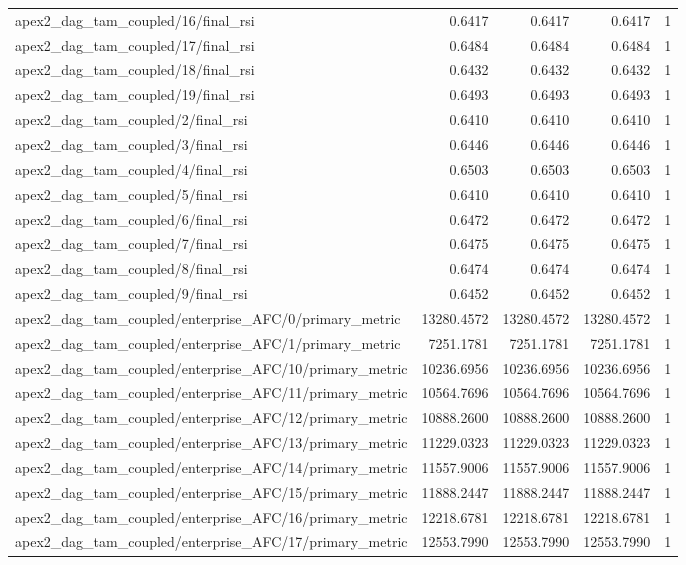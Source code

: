 \begin{table}[h]
\begin{tabular}{lrrrr}
apex2_dag_tam_coupled/16/final_rsi & 0.6417 & 0.6417 & 0.6417 & 1 \\
apex2_dag_tam_coupled/17/final_rsi & 0.6484 & 0.6484 & 0.6484 & 1 \\
apex2_dag_tam_coupled/18/final_rsi & 0.6432 & 0.6432 & 0.6432 & 1 \\
apex2_dag_tam_coupled/19/final_rsi & 0.6493 & 0.6493 & 0.6493 & 1 \\
apex2_dag_tam_coupled/2/final_rsi & 0.6410 & 0.6410 & 0.6410 & 1 \\
apex2_dag_tam_coupled/3/final_rsi & 0.6446 & 0.6446 & 0.6446 & 1 \\
apex2_dag_tam_coupled/4/final_rsi & 0.6503 & 0.6503 & 0.6503 & 1 \\
apex2_dag_tam_coupled/5/final_rsi & 0.6410 & 0.6410 & 0.6410 & 1 \\
apex2_dag_tam_coupled/6/final_rsi & 0.6472 & 0.6472 & 0.6472 & 1 \\
apex2_dag_tam_coupled/7/final_rsi & 0.6475 & 0.6475 & 0.6475 & 1 \\
apex2_dag_tam_coupled/8/final_rsi & 0.6474 & 0.6474 & 0.6474 & 1 \\
apex2_dag_tam_coupled/9/final_rsi & 0.6452 & 0.6452 & 0.6452 & 1 \\
apex2_dag_tam_coupled/enterprise_AFC/0/primary_metric & 13280.4572 & 13280.4572 & 13280.4572 & 1 \\
apex2_dag_tam_coupled/enterprise_AFC/1/primary_metric & 7251.1781 & 7251.1781 & 7251.1781 & 1 \\
apex2_dag_tam_coupled/enterprise_AFC/10/primary_metric & 10236.6956 & 10236.6956 & 10236.6956 & 1 \\
apex2_dag_tam_coupled/enterprise_AFC/11/primary_metric & 10564.7696 & 10564.7696 & 10564.7696 & 1 \\
apex2_dag_tam_coupled/enterprise_AFC/12/primary_metric & 10888.2600 & 10888.2600 & 10888.2600 & 1 \\
apex2_dag_tam_coupled/enterprise_AFC/13/primary_metric & 11229.0323 & 11229.0323 & 11229.0323 & 1 \\
apex2_dag_tam_coupled/enterprise_AFC/14/primary_metric & 11557.9006 & 11557.9006 & 11557.9006 & 1 \\
apex2_dag_tam_coupled/enterprise_AFC/15/primary_metric & 11888.2447 & 11888.2447 & 11888.2447 & 1 \\
apex2_dag_tam_coupled/enterprise_AFC/16/primary_metric & 12218.6781 & 12218.6781 & 12218.6781 & 1 \\
apex2_dag_tam_coupled/enterprise_AFC/17/primary_metric & 12553.7990 & 12553.7990 & 12553.7990 & 1 \\

\end{tabular}
\end{table}
